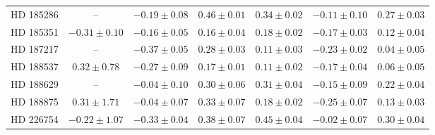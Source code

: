 \begin{table*}
\begin{tabular}{ccccccc}
HD 185286 & -- & $-0.19 \pm 0.08$ & $0.46 \pm 0.01$ & $0.34 \pm 0.02$ & $-0.11 \pm 0.10$ & $0.27 \pm 0.03$ \\
HD 185351 & $-0.31 \pm 0.10$ & $-0.16 \pm 0.05$ & $0.16 \pm 0.04$ & $0.18 \pm 0.02$ & $-0.17 \pm 0.03$ & $0.12 \pm 0.04$ \\
HD 187217 & -- & $-0.37 \pm 0.05$ & $0.28 \pm 0.03$ & $0.11 \pm 0.03$ & $-0.23 \pm 0.02$ & $0.04 \pm 0.05$ \\
HD 188537 & $0.32 \pm 0.78$ & $-0.27 \pm 0.09$ & $0.17 \pm 0.01$ & $0.11 \pm 0.02$ & $-0.17 \pm 0.04$ & $0.06 \pm 0.05$ \\
HD 188629 & -- & $-0.04 \pm 0.10$ & $0.30 \pm 0.06$ & $0.31 \pm 0.04$ & $-0.15 \pm 0.09$ & $0.22 \pm 0.04$ \\
HD 188875 & $0.31 \pm 1.71$ & $-0.04 \pm 0.07$ & $0.33 \pm 0.07$ & $0.18 \pm 0.02$ & $-0.25 \pm 0.07$ & $0.13 \pm 0.03$ \\
HD 226754 & $-0.22 \pm 1.07$ & $-0.33 \pm 0.04$ & $0.38 \pm 0.07$ & $0.45 \pm 0.04$ & $-0.02 \pm 0.07$ & $0.30 \pm 0.04$ \\
\hline
\end{tabular}
\end{table*}
